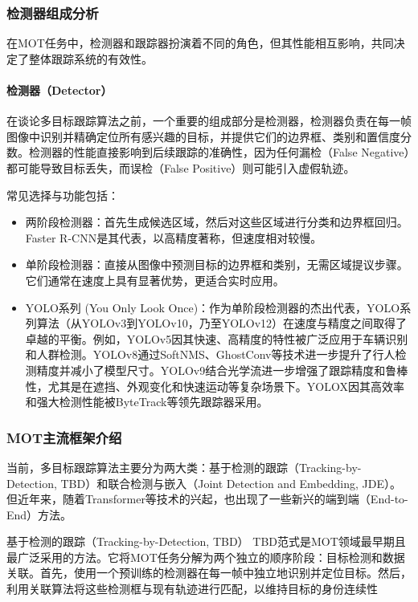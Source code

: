 \subsubsection{检测器组成分析}

在MOT任务中，检测器和跟踪器扮演着不同的角色，但其性能相互影响，共同决定了整体跟踪系统的有效性。

\paragraph{检测器（Detector）}
在谈论多目标跟踪算法之前，一个重要的组成部分是检测器，检测器负责在每一帧图像中识别并精确定位所有感兴趣的目标，并提供它们的边界框、类别和置信度分数。检测器的性能直接影响到后续跟踪的准确性，因为任何漏检（False Negative）都可能导致目标丢失，而误检（False Positive）则可能引入虚假轨迹\cite{169}。

常见选择与功能包括：

\begin{itemize}
    \item 两阶段检测器：首先生成候选区域，然后对这些区域进行分类和边界框回归。Faster R-CNN是其代表，以高精度著称，但速度相对较慢\cite{88}。
    \item 单阶段检测器：直接从图像中预测目标的边界框和类别，无需区域提议步骤。它们通常在速度上具有显著优势，更适合实时应用\cite{145}。
    \item YOLO系列 (You Only Look Once)：作为单阶段检测器的杰出代表，YOLO系列算法（从YOLOv3到YOLOv10，乃至YOLOv12）在速度与精度之间取得了卓越的平衡。例如，YOLOv5因其快速、高精度的特性被广泛应用于车辆识别\cite{121}和人群检测\cite{105}。YOLOv8通过SoftNMS、GhostConv等技术进一步提升了行人检测精度并减小了模型尺寸\cite{190}。YOLOv9结合光学流进一步增强了跟踪精度和鲁棒性，尤其是在遮挡、外观变化和快速运动等复杂场景下\cite{141}。YOLOX因其高效率和强大检测性能被ByteTrack等领先跟踪器采用\cite{90}。
\end{itemize}


\subsubsection{MOT主流框架介绍}

当前，多目标跟踪算法主要分为两大类：基于检测的跟踪（Tracking-by-Detection, TBD）和联合检测与嵌入（Joint Detection and Embedding, JDE）。但近年来，随着Transformer等技术的兴起，也出现了一些新兴的端到端（End-to-End）方法。

基于检测的跟踪（Tracking-by-Detection, TBD）
TBD范式是MOT领域最早期且最广泛采用的方法。它将MOT任务分解为两个独立的顺序阶段：目标检测和数据关联。首先，使用一个预训练的检测器在每一帧中独立地识别并定位目标。然后，利用关联算法将这些检测框与现有轨迹进行匹配，以维持目标的身份连续性\cite{152}

